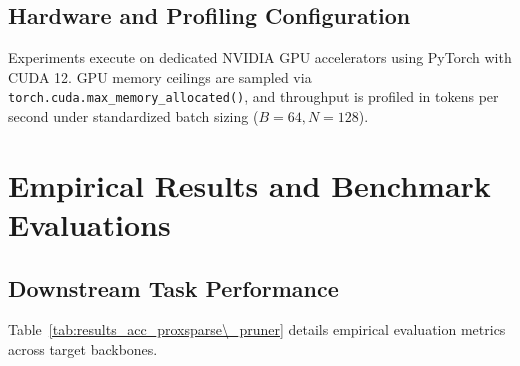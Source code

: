 \subsection{Hardware and Profiling Configuration}
Experiments execute on dedicated NVIDIA GPU accelerators using PyTorch with CUDA 12. GPU memory ceilings are sampled via \texttt{torch.cuda.max\_memory\_allocated()}, and throughput is profiled in tokens per second under standardized batch sizing ($B=64, N=128$).


\section{Empirical Results and Benchmark Evaluations}

\subsection{Downstream Task Performance}
Table~\ref{tab:results_acc_proxsparse\_pruner} details empirical evaluation metrics across target backbones.

